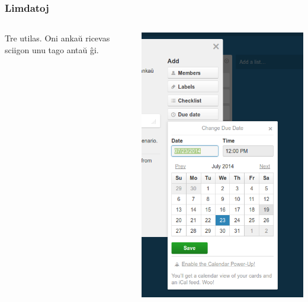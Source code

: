   \begin{frame}
    \frametitle{Limdatoj}

    \begin{columns}
    
    Tre utilas. Oni ankaŭ ricevas sciigon unu tago antaŭ ĝi.
    
    	
    
    \includegraphics[scale=0.2]{ekranoj/limdato}
	
	\end{columns}
	
	
	
  \end{frame}



